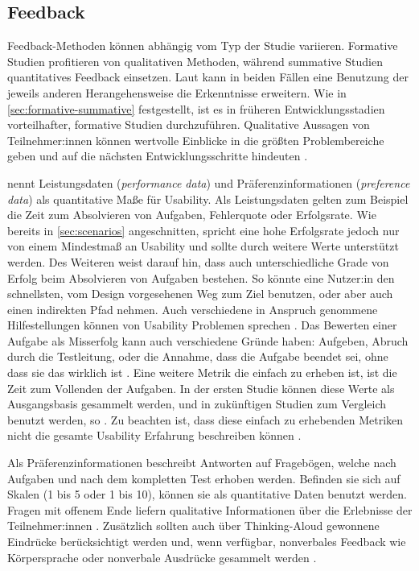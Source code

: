 \subsection{Feedback}
\label{sec:feedback}

Feedback-Methoden können abhängig vom Typ der Studie variieren. Formative Studien profitieren von qualitativen Methoden, während summative Studien quantitatives Feedback einsetzen. Laut \textcite{barnumUsabilityTesting2021} kann in beiden Fällen eine Benutzung der jeweils anderen Herangehensweise die Erkenntnisse erweitern. Wie in \ref{sec:formative-summative} festgestellt, ist es in früheren Entwicklungsstadien vorteilhafter, formative Studien durchzuführen. Qualitative Aussagen von Teilnehmer:innen können wertvolle Einblicke in die größten Problembereiche geben und auf die nächsten Entwicklungsschritte hindeuten \parencite{barnumUsabilityTesting2021}.

\textcite{barnumUsabilityTesting2021} nennt Leistungsdaten (\textit{performance data}) und Präferenzinformationen (\textit{preference data}) als quantitative Maße für Usability. Als Leistungsdaten gelten zum Beispiel die Zeit zum Absolvieren von Aufgaben, Fehlerquote oder Erfolgsrate. Wie bereits in \ref{sec:scenarios} angeschnitten, spricht eine hohe Erfolgsrate jedoch nur von einem Mindestmaß an Usability und sollte durch weitere Werte unterstützt werden. Des Weiteren weist \textcite{barnumUsabilityTesting2021} darauf hin, dass auch unterschiedliche Grade von Erfolg beim Absolvieren von Aufgaben bestehen. So könnte eine Nutzer:in den schnellsten, vom Design vorgesehenen Weg zum Ziel benutzen, oder aber auch einen indirekten Pfad nehmen. Auch verschiedene in Anspruch genommene Hilfestellungen können von Usability Problemen sprechen \parencite{barnumUsabilityTesting2021}. Das Bewerten einer Aufgabe als Misserfolg kann auch verschiedene Gründe haben: Aufgeben, Abruch durch die Testleitung, oder die Annahme, dass die Aufgabe beendet sei, ohne dass sie das wirklich ist \parencite{barnumUsabilityTesting2021}. Eine weitere Metrik die einfach zu erheben ist, ist die Zeit zum Vollenden der Aufgaben. In der ersten Studie können diese Werte als Ausgangsbasis gesammelt werden, und in zukünftigen Studien zum Vergleich benutzt werden, so \textcite{barnumUsabilityTesting2021}. Zu beachten ist, dass diese einfach zu erhebenden Metriken nicht die gesamte Usability Erfahrung beschreiben können \parencite{barnumUsabilityTesting2021}.

Als Präferenzinformationen beschreibt \textcite{barnumUsabilityTesting2021} Antworten auf Fragebögen, welche nach Aufgaben und nach dem kompletten Test erhoben werden. Befinden sie sich auf Skalen (1 bis 5 oder 1 bis 10), können sie als quantitative Daten benutzt werden. Fragen mit offenem Ende liefern qualitative Informationen über die Erlebnisse der Teilnehmer:innen \parencite{barnumUsabilityTesting2021}. Zusätzlich sollten auch über Thinking-Aloud gewonnene Eindrücke berücksichtigt werden und, wenn verfügbar, nonverbales Feedback wie Körpersprache oder nonverbale Ausdrücke gesammelt werden \parencite{barnumUsabilityTesting2021}.

